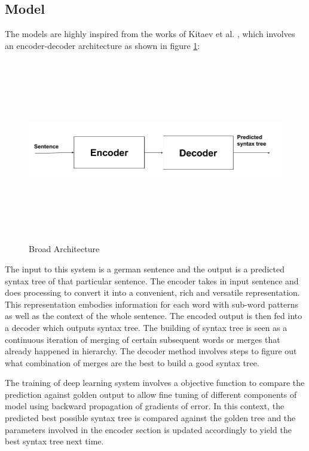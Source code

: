 \documentclass[a4paper, 11pt]{article}
\begin{document}
\subsection{Model}

The models are highly inspired from the works of Kitaev et al. \parencite*{Kitaev2019}, which involves an encoder-decoder architecture as shown in figure \ref{fig:broad_architecture}:

\begin{figure}[htpb]
    \centering
    \includegraphics[width=\textwidth,height=8cm,keepaspectratio=true]
    {encoder-decoder.png}
    \caption{
        Broad Architecture
    }
    \label{fig:broad_architecture}
\end{figure}

The input to this system is a german sentence and the output is a predicted syntax tree of that particular sentence. The encoder takes in input sentence and does processing to convert it into a convenient, rich and versatile representation. This representation embodies information for each word with sub-word patterns as well as the context of the whole sentence. The encoded output is then fed into a decoder which outputs syntax tree. The building of syntax tree is seen as a continuous iteration of merging of certain subsequent words or merges that already happened in hierarchy. The decoder method involves steps to figure out what combination of merges are the best to build a good syntax tree.

The training of deep learning system involves a objective function to compare the prediction against golden output to allow fine tuning of different components of model using backward propagation of gradients of error. In this context, the predicted best possible syntax tree is compared against the golden tree and the parameters involved in the encoder section is updated accordingly to yield the best syntax tree next time. 
\end{document}
